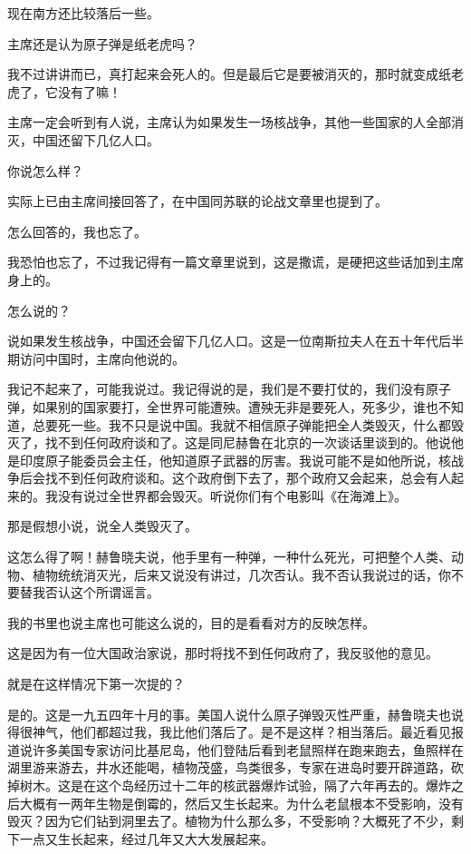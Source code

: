 现在南方还比较落后一些。

主席还是认为原子弹是纸老虎吗？

我不过讲讲而已，真打起来会死人的。但是最后它是要被消灭的，那时就变成纸老虎了，它没有了嘛！

主席一定会听到有人说，主席认为如果发生一场核战争，其他一些国家的人全部消灭，中国还留下几亿人口。

你说怎么样？

实际上已由主席间接回答了，在中国同苏联的论战文章里也提到了。

怎么回答的，我也忘了。

我恐怕也忘了，不过我记得有一篇文章里说到，这是撒谎，是硬把这些话加到主席身上的。

怎么说的？

说如果发生核战争，中国还会留下几亿人口。这是一位南斯拉夫人在五十年代后半期访问中国时，主席向他说的。

我记不起来了，可能我说过。我记得说的是，我们是不要打仗的，我们没有原子弹，如果别的国家要打，全世界可能遭殃。遭殃无非是要死人，死多少，谁也不知道，总要死一些。我不只是说中国。我就不相信原子弹能把全人类毁灭，什么都毁灭了，找不到任何政府谈和了。这是同尼赫鲁在北京的一次谈话里谈到的。他说他是印度原子能委员会主任，他知道原子武器的厉害。我说可能不是如他所说，核战争后会找不到任何政府谈和。这个政府倒下去了，那个政府又会起来，总会有人起来的。我没有说过全世界都会毁灭。听说你们有个电影叫《在海滩上》。

那是假想小说，说全人类毁灭了。

这怎么得了啊！赫鲁晓夫说，他手里有一种弹，一种什么死光，可把整个人类、动物、植物统统消灭光，后来又说没有讲过，几次否认。我不否认我说过的话，你不要替我否认这个所谓谣言。

我的书里也说主席也可能这么说的，目的是看看对方的反映怎样。

这是因为有一位大国政治家说，那时将找不到任何政府了，我反驳他的意见。

就是在这样情况下第一次提的？

是的。这是一九五四年十月的事。美国人说什么原子弹毁灭性严重，赫鲁晓夫也说得很神气，他们都超过我，我比他们落后了。是不是这样？相当落后。最近看见报道说许多美国专家访问比基尼岛，他们登陆后看到老鼠照样在跑来跑去，鱼照样在湖里游来游去，井水还能喝，植物茂盛，鸟类很多，专家在进岛时要开辟道路，砍掉树木。这是在这个岛经历过十二年的核武器爆炸试验，隔了六年再去的。爆炸之后大概有一两年生物是倒霉的，然后又生长起来。为什么老鼠根本不受影响，没有毁灭？因为它们钻到洞里去了。植物为什么那么多，不受影响？大概死了不少，剩下一点又生长起来，经过几年又大大发展起来。

